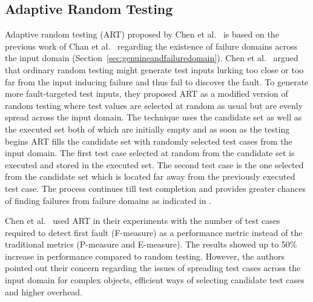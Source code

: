 \subsection{Adaptive Random Testing}
\label{sec:artpatterns_2}
Adaptive random testing (ART) proposed by Chen et al.~\cite{chen2005adaptive} is based on the previous work of Chan et al.~\cite{chan1996proportional} regarding the existence of failure domains across the input domain (Section~\ref{sec:genuineandfailuredomain}). Chen et al.~\cite{chen2005adaptive} argued that ordinary random testing might generate test inputs lurking too close or too far from the input inducing failure and thus fail to discover the fault. To generate more fault-targeted test inputs, they proposed ART as a modified version of random testing where test values are selected at random as usual but are evenly spread across the input domain. The technique uses the candidate set as well as the executed set both of which are initially empty and as soon as the testing begins ART fills the candidate set with randomly selected test cases from the input domain. The first test case selected at random from the candidate set is executed and stored in the executed set. The second test case is the one selected from the candidate set which is located far away from the previously executed test case. The process continues till test completion and provides greater chances of finding failures from failure domains as indicated in \cite{chen2005adaptive}.

Chen et al.~\cite{chen2005adaptive} used ART in their experiments with the number of test cases required to detect first fault (F-measure) as a performance metric instead of the traditional metrics (P-measure and E-measure). The results showed up to 50\% increase in performance compared to random testing. However, the authors pointed out their concern regarding the issues of spreading test cases across the input domain for complex objects, efficient ways of selecting candidate test cases and higher overhead. %

